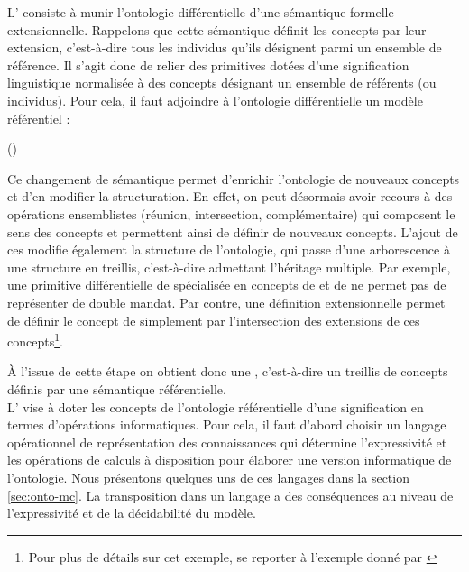 \g{[2.]} L' consiste à munir l'ontologie différentielle d'une sémantique formelle extensionnelle.
Rappelons que cette sémantique définit les concepts par leur extension, c'est-à-dire tous les individus qu'ils désignent parmi un ensemble de référence. 
Il s'agit donc de relier des primitives dotées d'une signification linguistique normalisée à des concepts désignant un ensemble de référents (ou individus).
Pour cela, il faut adjoindre à l'ontologie différentielle un modèle référentiel : 

	 (\cite[p.148]{bachimont:icc})

Ce changement de sémantique permet d'enrichir l'ontologie de nouveaux concepts et d'en modifier la structuration. 
En effet, on peut désormais avoir recours à des opérations ensemblistes (réunion, intersection, complémentaire) qui composent le sens des concepts et permettent ainsi de définir de nouveaux concepts.
L'ajout de ces  modifie également la structure de l'ontologie, qui passe d'une arborescence à une structure en treillis, c'est-à-dire admettant l'héritage multiple. 
Par exemple, une primitive différentielle de  spécialisée en concepts de  et de  ne permet pas de représenter de double mandat.
Par contre, une définition extensionnelle permet de définir le concept de  simplement par l'intersection des extensions de ces concepts\footnote{Pour plus de détails sur cet exemple, se reporter à l'exemple donné par \cite[p.149]{bachimont:icc}}.

À l'issue de cette étape on obtient donc une , c'est-à-dire un treillis de concepts définis par une sémantique référentielle.\\

\g{[3.]} L' vise à doter les concepts de l'ontologie référentielle d'une signification en termes d'opérations informatiques.
Pour cela, il faut d'abord choisir un langage opérationnel de représentation des connaissances qui détermine l'expressivité et les opérations de calculs à disposition pour élaborer une version informatique de l'ontologie.
Nous présentons quelques uns de ces langages dans la section \ref{sec:onto-mc}.
La transposition dans un langage a des conséquences au niveau de l'expressivité et de la décidabilité du modèle.

